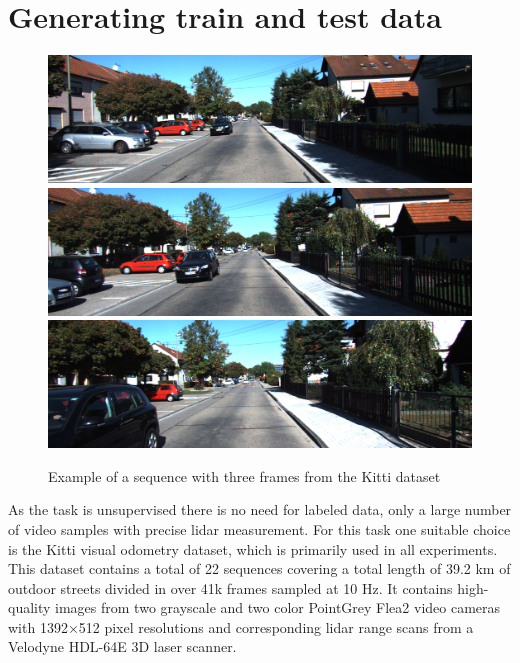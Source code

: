 \section{Generating train and test data}
\begin{figure}[t]
\centering
\includegraphics[width=\textwidth]{images/img_first.png}
\includegraphics[width=\textwidth]{images/img_second.png}
\includegraphics[width=\textwidth]{images/img_third.png}
\caption{Example of a sequence with three frames from the Kitti dataset~\cite{geiger2012}}
\label{fig:frames}
\end{figure}

As the task is unsupervised there is no need for labeled data, only a large number of video samples with precise lidar measurement. For this task one suitable choice is the Kitti\cite{geiger2012} visual odometry dataset, which is primarily used in all experiments. This dataset contains a total of 22 sequences covering a total length of 39.2 km of outdoor streets divided in over 41k frames sampled at 10 Hz. It contains high-quality images from two grayscale and two color PointGrey Flea2 video cameras with 1392×512 pixel resolutions and corresponding lidar range scans from a Velodyne HDL-64E 3D laser scanner.

